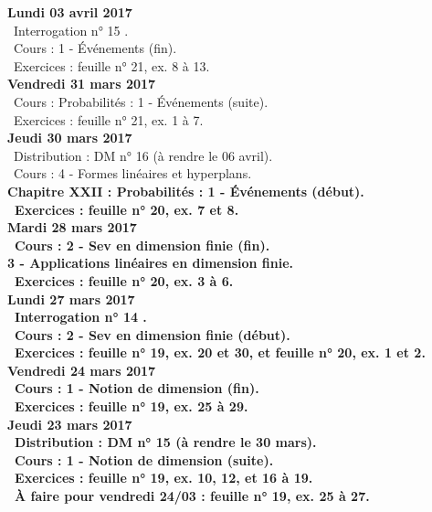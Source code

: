 \documentclass[12pt,a4paper]{article}
\begin{document}
\noindent\textbf{\bf Lundi 03 avril 2017} \\
\bu\ Interrogation n° 15 .\\
\bu\ Cours : 1 - Événements (fin).\\
\bu\ Exercices : feuille n° 21, ex. 8 à 13.\vspace{.4cm}\\

\noindent\textbf{Vendredi 31 mars 2017}\\
\bu\ Cours : Probabilités : 1 - Événements (suite).\\
\bu\ Exercices : feuille n° 21, ex. 1 à 7.\vspace{.4cm}\\

\noindent\textbf{Jeudi 30 mars 2017}\\
\bu\ Distribution : DM n° 16 (à rendre le 06 avril).\\
\bu\ Cours : 4 - Formes linéaires et hyperplans.\\
\bf Chapitre XXII \rm : Probabilités : 1 - Événements (début).\\
\bu\ Exercices : feuille n° 20, ex. 7 et 8.\vspace{.4cm}\\

\noindent\textbf{\bf Mardi 28 mars 2017} \\
\bu\ Cours : 2 - Sev en dimension finie (fin).\\
3 - Applications linéaires en dimension finie.\\
\bu\ Exercices : feuille n° 20, ex. 3 à 6.\vspace{.4cm}\\

\noindent\textbf{\bf Lundi 27 mars 2017} \\
\bu\ Interrogation n° 14 .\\
\bu\ Cours : 2 - Sev en dimension finie (début).\\
\bu\ Exercices : feuille n° 19, ex. 20 et 30, et feuille n° 20, ex. 1 et 2.\vspace{.4cm}\\

\noindent\textbf{Vendredi 24 mars 2017}\\
\bu\ Cours : 1 - Notion de dimension (fin).\\
\bu\ Exercices : feuille n° 19, ex. 25 à 29.\vspace{.4cm}\\

\noindent\textbf{Jeudi 23 mars 2017}\\
\bu\ Distribution : DM n° 15 (à rendre le 30 mars).\\
\bu\ Cours : 1 - Notion de dimension (suite).\\
\bu\ Exercices : feuille n° 19, ex. 10, 12, et 16 à 19.\\
\bu\ À faire pour vendredi 24/03 : feuille n° 19, ex. 25 à 27.\vspace{.4cm}\\
\end{document}
